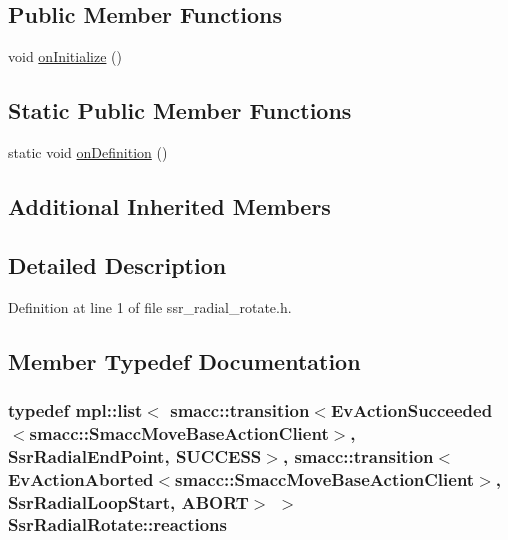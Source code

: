 \subsection*{Public Member Functions}
\begin{DoxyCompactItemize}
\item 
void \hyperlink{structSsrRadialRotate_a91b3de3b25e4cf0d3a672f6ea344abea}{on\+Initialize} ()
\end{DoxyCompactItemize}
\subsection*{Static Public Member Functions}
\begin{DoxyCompactItemize}
\item 
static void \hyperlink{structSsrRadialRotate_a96e76900952f342ee6591b84168f927f}{on\+Definition} ()
\end{DoxyCompactItemize}
\subsection*{Additional Inherited Members}


\subsection{Detailed Description}


Definition at line 1 of file ssr\+\_\+radial\+\_\+rotate.\+h.



\subsection{Member Typedef Documentation}
\subsubsection[{\texorpdfstring{reactions}{reactions}}]{\setlength{\rightskip}{0pt plus 5cm}typedef mpl\+::list$<$ {\bf smacc\+::transition}$<$Ev\+Action\+Succeeded$<${\bf smacc\+::\+Smacc\+Move\+Base\+Action\+Client}$>$, {\bf Ssr\+Radial\+End\+Point}, {\bf S\+U\+C\+C\+E\+SS}$>$, {\bf smacc\+::transition}$<$Ev\+Action\+Aborted$<${\bf smacc\+::\+Smacc\+Move\+Base\+Action\+Client}$>$, {\bf Ssr\+Radial\+Loop\+Start}, {\bf A\+B\+O\+RT}$>$ $>$ {\bf Ssr\+Radial\+Rotate\+::reactions}}\hypertarget{structSsrRadialRotate_aa245c3696d8d119ec6f2ea5573f6b7ea}{}\label{structSsrRadialRotate_aa245c3696d8d119ec6f2ea5573f6b7ea}


